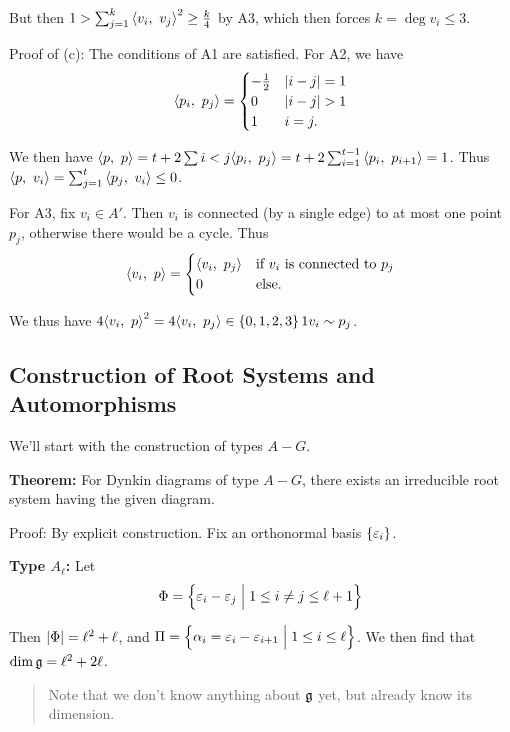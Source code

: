 But then \(1 > \sum_{j=1}^k {\left\langle {v_i},~{v_j} \right\rangle}^2 \geq \frac k 4\) by A3,
which then forces \(k = \deg v_i \leq 3\).

Proof of (c): The conditions of A1 are satisfied. For A2, we have \[
{\left\langle {p_i},~{p_j} \right\rangle} = \begin{cases} -\frac 1 2 & {\left\lvert {i-j} \right\rvert} = 1 \\ 0 & {\left\lvert {i-j} \right\rvert} > 1 \\ 1 & i=j.\end{cases}
\]

We then have
\({\left\langle {p},~{p} \right\rangle} = t + 2 \sum{i<j} {\left\langle {p_i},~{p_j} \right\rangle} = t + 2\sum_{i=1}^{t-1} {\left\langle {p_i},~{p_{i+1}} \right\rangle} = 1\).
Thus \({\left\langle {p},~{v_i} \right\rangle} = \sum_{j=1}^t {\left\langle {p_j},~{v_i} \right\rangle} \leq 0\).

For A3, fix \(v_i \in A'\). Then \(v_i\) is connected (by a single edge)
to at most one point \(p_j\), otherwise there would be a cycle. Thus \[
{\left\langle {v_i},~{p} \right\rangle} = 
\begin{cases} 
{\left\langle {v_i},~{p_j} \right\rangle} & \text{if $v_i$ is connected to $p_j$} \\ 
0 & \text{else}.
\end{cases}
\]

We thus have
\(4{{\left\langle {v_i},~{p} \right\rangle}}^2 = 4{{\left\langle {v_i},~{p_j} \right\rangle}} \in \left\{{0,1,2,3}\right\} \mathrm{1}{v_i \sim p_j}\).

\hypertarget{construction-of-root-systems-and-automorphisms}{%
\subsection{Construction of Root Systems and
Automorphisms}\label{construction-of-root-systems-and-automorphisms}}

We'll start with the construction of types \(A-G\).

\textbf{Theorem:} For Dynkin diagrams of type \(A-G\), there exists an
irreducible root system having the given diagram.

Proof: By explicit construction. Fix an orthonormal basis
\(\left\{{\varepsilon_i}\right\}\).

\textbf{Type \(A_\ell\):} Let \[
\Phi = \left\{{\varepsilon_i - \varepsilon_j \mathrel{\Big|} 1 \leq i\neq j \leq \ell + 1}\right\}
\]

Then \({\left\lvert {\Phi} \right\rvert} = \ell^2 + \ell\), and
\(\Pi = \left\{{\alpha_i = \varepsilon_i - \varepsilon_{i+1} \mathrel{\Big|} 1 \leq i \leq \ell}\right\}\).
We then find that \(\dim {\mathfrak{g}} = \ell^2 + 2\ell\).

\begin{quote}
Note that we don't know anything about \({\mathfrak{g}}\) yet, but already know
its dimension.
\end{quote}

